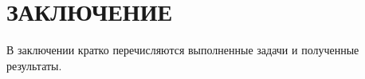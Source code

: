 \section*{ЗАКЛЮЧЕНИЕ}

В заключении кратко перечисляются выполненные задачи и полученные результаты.
